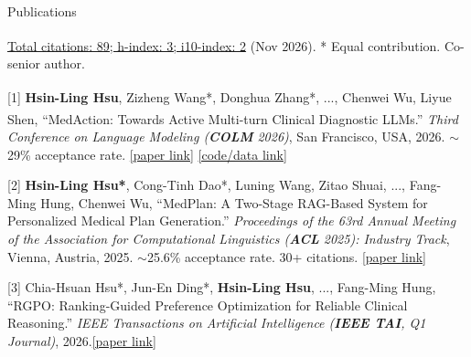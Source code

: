 \documentclass{resume} %
\newcommand{\lnk}[2]{\href{#1}{\textcolor{linkblue}{[#2]}}} %
\begin{document}
\begin{rSection}{Publications}

\href{https://scholar.google.com/citations?user=pCXJM5AAAAAJ}{Total citations: 89; h-index: 3; i10-index: 2} (Nov 2026).
\hspace{0.1cm}* Equal contribution. \textsuperscript{\dag} Co-senior author.


[1] \textbf{Hsin-Ling Hsu}, Zizheng Wang*, Donghua Zhang*, ..., Chenwei Wu\textsuperscript{\dag}, Liyue Shen\textsuperscript{\dag}, ``MedAction: Towards Active Multi-turn Clinical Diagnostic LLMs.''
\textit{Third Conference on Language Modeling (\textbf{COLM} 2026)}, San Francisco, USA, 2026. $\sim$29\% acceptance rate.
\hspace{0.1cm}\lnk{https://openreview.net/forum?id=2ZtsUgwVbx}{paper link}
\hspace{0.1cm}\lnk{https://github.com/JustinHsu1019/MedAction}{code/data link}

[2] \textbf{Hsin-Ling Hsu*}, Cong-Tinh Dao*, Luning Wang, Zitao Shuai, ..., Fang-Ming Hung, Chenwei Wu, ``MedPlan: A Two-Stage RAG-Based System for Personalized Medical Plan Generation.''
\textit{Proceedings of the 63rd Annual Meeting of the Association for Computational Linguistics (\textbf{ACL} 2025): Industry Track}, Vienna, Austria, 2025. $\sim$25.6\% acceptance rate. 30+ citations.
\hspace{0.1cm}\lnk{https://aclanthology.org/2025.acl-industry.76.pdf}{paper link}

[3] Chia-Hsuan Hsu*, Jun-En Ding*, \textbf{Hsin-Ling Hsu}, ..., Fang-Ming Hung, ``RGPO: Ranking-Guided Preference Optimization for Reliable Clinical Reasoning.''
\textit{IEEE Transactions on Artificial Intelligence (\textbf{IEEE TAI}, Q1 Journal)}, 2026.\hspace{0.1cm}\lnk{https://ieeexplore.ieee.org/document/11495200}{paper link}



\end{rSection}
\end{document}
